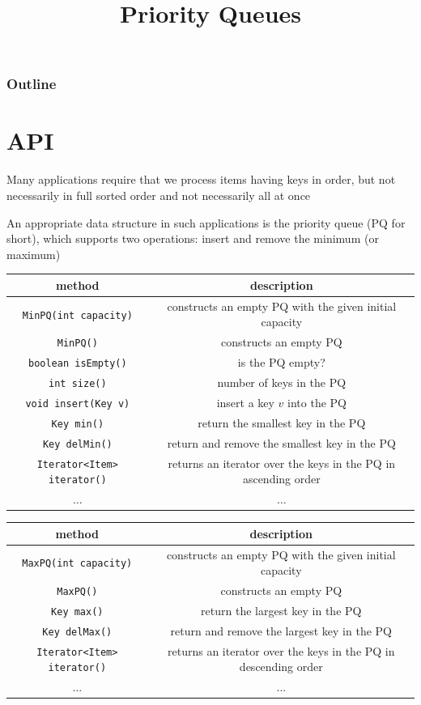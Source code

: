 \documentclass[8pt,a4paper,compress]{beamer}
\title{Priority Queues}
\date{}
\begin{document}
\begin{frame}
\vfill
\titlepage
\end{frame}

\begin{frame}
\frametitle{Outline}
\tableofcontents
\end{frame}

\section{API}
\begin{frame}[fragile]
Many applications require that we process items having keys in order, but not necessarily in full sorted order and not necessarily all at once

\bigskip

An appropriate data structure in such applications is the priority queue (PQ for short), which supports two operations: insert and remove the minimum (or maximum)

\begin{center}
\begin{tabular}{cc}
method & description \\ \hline
\lstinline$MinPQ(int capacity)$ & constructs an empty PQ with the given initial capacity \\
\lstinline$MinPQ()$ & constructs an empty PQ \\
\lstinline$boolean isEmpty()$ & is the PQ empty? \\
\lstinline$int size()$ & number of keys in the PQ \\
\lstinline$void insert(Key v)$ & insert a key $v$ into the PQ \\
\lstinline$Key min()$ & return the smallest key in the PQ \\
\lstinline$Key delMin()$ & return and remove the smallest key in the PQ \\
\lstinline$Iterator<Item> iterator()$ & returns an iterator over the keys in the PQ in ascending order \\
$\dots$ & $\dots$
\end{tabular} 
\end{center}

\smallskip

\begin{center}
\begin{tabular}{cc}
method & description \\ \hline
\lstinline$MaxPQ(int capacity)$ & constructs an empty PQ with the given initial capacity \\
\lstinline$MaxPQ()$ & constructs an empty PQ \\
\lstinline$Key max()$ & return the largest key in the PQ \\
\lstinline$Key delMax()$ & return and remove the largest key in the PQ \\
\lstinline$Iterator<Item> iterator()$ & returns an iterator over the keys in the PQ in descending order \\
$\dots$ & $\dots$
\end{tabular} 
\end{center}
\end{frame}
\end{document}
